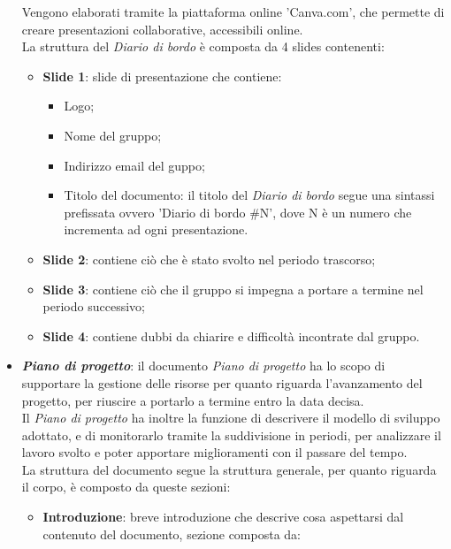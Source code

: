\begin{itemize}
          Vengono elaborati tramite la piattaforma online 'Canva.com', che permette di creare presentazioni collaborative, accessibili online.\\
          La struttura del \textit{Diario di bordo} è composta da 4 slides contenenti:
          \begin{itemize}
              \item \textbf{Slide 1}: slide di presentazione che contiene:
                    \begin{itemize}
                        \item Logo;
                        \item Nome del gruppo;
                        \item Indirizzo email del guppo;
                        \item Titolo del documento: il titolo del \textit{Diario di bordo} segue una sintassi
                              prefissata ovvero 'Diario di bordo \#N', dove N è un numero che incrementa ad
                              ogni presentazione.
                    \end{itemize}
              \item \textbf{Slide 2}: contiene ciò che è stato svolto nel periodo trascorso;
              \item \textbf{Slide 3}: contiene ciò che il gruppo si impegna a portare a termine nel periodo successivo;
              \item \textbf{Slide 4}: contiene dubbi da chiarire e difficoltà incontrate dal gruppo.
          \end{itemize}
    \item \textit{\textbf{Piano di progetto}}: il documento \textit{Piano di progetto} ha lo scopo di supportare la gestione delle risorse per quanto riguarda l'avanzamento del progetto, per riuscire a portarlo a termine entro la data decisa.\\
          Il \textit{Piano di progetto} ha inoltre la funzione di descrivere il modello di sviluppo adottato, e di monitorarlo tramite la suddivisione in periodi, per analizzare il lavoro svolto e poter apportare miglioramenti con il passare del tempo.
          \\La struttura del documento segue la struttura generale, per quanto riguarda il corpo, è composto da queste sezioni:
          \begin{itemize}
              \item \textbf{Introduzione}: breve introduzione che descrive cosa aspettarsi dal contenuto del documento, sezione composta da:

\end{itemize}
\end{itemize}
